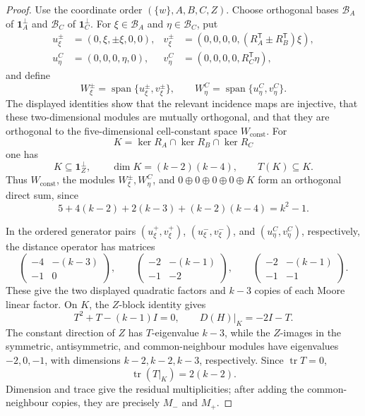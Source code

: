 \documentclass[10pt,a4paper]{amsart}
\newcommand{\one}{\mathbf 1}
\newcommand{\tr}{\operatorname{tr}}
\begin{document}
\begin{proof}
Use the coordinate order \((\{w\},A,B,C,Z)\).  Choose orthogonal bases
\(\mathcal B_A\) of \(\one_A^\perp\) and
\(\mathcal B_C\) of \(\one_C^\perp\).  For
\(\xi\in\mathcal B_A\) and \(\eta\in\mathcal B_C\), put
\[
\begin{aligned}
u_\xi^\pm&=(0,\xi,\pm\xi,0,0),&
v_\xi^\pm&=(0,0,0,0,
 (R_A^{\mathsf T}\pm R_B^{\mathsf T})\xi),\\
u_\eta^C&=(0,0,0,\eta,0),&
v_\eta^C&=(0,0,0,0,R_C^{\mathsf T}\eta),
\end{aligned}
\]
and define
\[
 W_\xi^\pm=\operatorname{span}\{u_\xi^\pm,v_\xi^\pm\},
 \qquad
 W_\eta^C=\operatorname{span}\{u_\eta^C,v_\eta^C\}.
\]
The displayed identities show that the relevant incidence maps are
injective, that these two-dimensional modules are mutually orthogonal,
and that they are orthogonal to the five-dimensional cell-constant space
\(W_{\mathrm{const}}\).  For
\[
 K=\ker R_A\cap\ker R_B\cap\ker R_C
\]
one has
\[
 K\subseteq\one_Z^\perp,\qquad
 \dim K=(k-2)(k-4),\qquad T(K)\subseteq K.
\]
Thus \(W_{\mathrm{const}}\), the modules \(W_\xi^\pm,W_\eta^C\), and
\(0\oplus0\oplus0\oplus0\oplus K\) form an orthogonal direct sum, since
\[
 5+4(k-2)+2(k-3)+(k-2)(k-4)=k^2-1.
\]

In the ordered generator pairs
\((u_\xi^+,v_\xi^+)\), \((u_\xi^-,v_\xi^-)\), and
\((u_\eta^C,v_\eta^C)\), respectively, the distance operator has matrices
\[
 \begin{pmatrix}-4&-(k-3)\\-1&0\end{pmatrix},\qquad
 \begin{pmatrix}-2&-(k-1)\\-1&-2\end{pmatrix},\qquad
 \begin{pmatrix}-2&-(k-1)\\-1&-1\end{pmatrix}.
\]
These give the two displayed quadratic factors and \(k-3\) copies of
each Moore linear factor.  On \(K\), the \(Z\)-block identity gives
\[
 T^2+T-(k-1)I=0,
 \qquad D(H)|_K=-2I-T.
\]
The constant direction of \(Z\) has \(T\)-eigenvalue \(k-3\), while the
\(Z\)-images in the symmetric, antisymmetric, and common-neighbour
modules have eigenvalues \(-2,0,-1\), with dimensions
\(k-2,k-2,k-3\), respectively.  Since \(\tr T=0\),
\[
 \tr(T|_K)=2(k-2).
\]
Dimension and trace give the residual multiplicities; after adding the
common-neighbour copies, they are precisely \(M_-\) and \(M_+\).


\end{proof}
\end{document}
